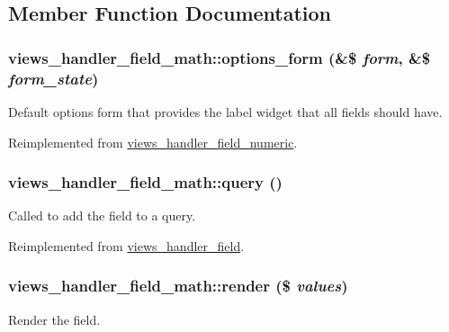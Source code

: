 \subsection{Member Function Documentation}
\hypertarget{classviews__handler__field__math_a0a1d90a724d24fc1ae096413749aba05}{
\subsubsection[{options\_\-form}]{\setlength{\rightskip}{0pt plus 5cm}views\_\-handler\_\-field\_\-math::options\_\-form (\&\$ {\em form}, \/  \&\$ {\em form\_\-state})}}
\label{classviews__handler__field__math_a0a1d90a724d24fc1ae096413749aba05}
Default options form that provides the label widget that all fields should have. 

Reimplemented from \hyperlink{classviews__handler__field__numeric_ae6f81d1896ece64e9450ebc2d60da2fd}{views\_\-handler\_\-field\_\-numeric}.\hypertarget{classviews__handler__field__math_a2a7e7e461f4790e2d5cad0d2ea7651d1}{
\subsubsection[{query}]{\setlength{\rightskip}{0pt plus 5cm}views\_\-handler\_\-field\_\-math::query ()}}
\label{classviews__handler__field__math_a2a7e7e461f4790e2d5cad0d2ea7651d1}
Called to add the field to a query. 

Reimplemented from \hyperlink{classviews__handler__field_a4f661f91bcbe80d4a00c30a31456c502}{views\_\-handler\_\-field}.\hypertarget{classviews__handler__field__math_a2d3ecd4f87873d06e47f9debabd78801}{
\subsubsection[{render}]{\setlength{\rightskip}{0pt plus 5cm}views\_\-handler\_\-field\_\-math::render (\$ {\em values})}}
\label{classviews__handler__field__math_a2d3ecd4f87873d06e47f9debabd78801}
Render the field.


